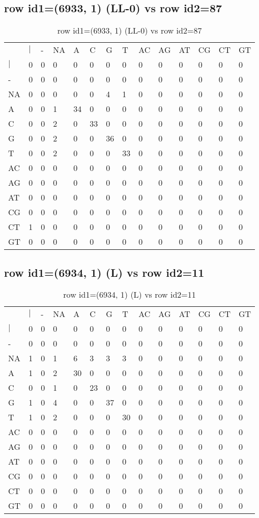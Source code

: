 \subsection{row id1=(6933, 1) (LL-0) vs row id2=87}
\begin{center}
\begin{longtable}{|l|l|l|l|l|l|l|l|l|l|l|l|l|l|}
\caption{row id1=(6933, 1) (LL-0) vs row id2=87} \label{table_dm134}\\
\hline
\\
\hline
&$|$&-&NA&A&C&G&T&AC&AG&AT&CG&CT&GT\\
$|$&0&0&0&0&0&0&0&0&0&0&0&0&0\\
-&0&0&0&0&0&0&0&0&0&0&0&0&0\\
NA&0&0&0&0&0&4&1&0&0&0&0&0&0\\
A&0&0&1&34&0&0&0&0&0&0&0&0&0\\
C&0&0&2&0&33&0&0&0&0&0&0&0&0\\
G&0&0&2&0&0&36&0&0&0&0&0&0&0\\
T&0&0&2&0&0&0&33&0&0&0&0&0&0\\
AC&0&0&0&0&0&0&0&0&0&0&0&0&0\\
AG&0&0&0&0&0&0&0&0&0&0&0&0&0\\
AT&0&0&0&0&0&0&0&0&0&0&0&0&0\\
CG&0&0&0&0&0&0&0&0&0&0&0&0&0\\
CT&1&0&0&0&0&0&0&0&0&0&0&0&0\\
GT&0&0&0&0&0&0&0&0&0&0&0&0&0\\
\hline
\end{longtable}
\end{center}

\subsection{row id1=(6934, 1) (L) vs row id2=11}
\begin{center}
\begin{longtable}{|l|l|l|l|l|l|l|l|l|l|l|l|l|l|}
\caption{row id1=(6934, 1) (L) vs row id2=11} \label{table_dm136}\\
\hline
\\
\hline
&$|$&-&NA&A&C&G&T&AC&AG&AT&CG&CT&GT\\
$|$&0&0&0&0&0&0&0&0&0&0&0&0&0\\
-&0&0&0&0&0&0&0&0&0&0&0&0&0\\
NA&1&0&1&6&3&3&3&0&0&0&0&0&0\\
A&1&0&2&30&0&0&0&0&0&0&0&0&0\\
C&0&0&1&0&23&0&0&0&0&0&0&0&0\\
G&1&0&4&0&0&37&0&0&0&0&0&0&0\\
T&1&0&2&0&0&0&30&0&0&0&0&0&0\\
AC&0&0&0&0&0&0&0&0&0&0&0&0&0\\
AG&0&0&0&0&0&0&0&0&0&0&0&0&0\\
AT&0&0&0&0&0&0&0&0&0&0&0&0&0\\
CG&0&0&0&0&0&0&0&0&0&0&0&0&0\\
CT&0&0&0&0&0&0&0&0&0&0&0&0&0\\
GT&0&0&0&0&0&0&0&0&0&0&0&0&0\\
\hline
\end{longtable}
\end{center}

